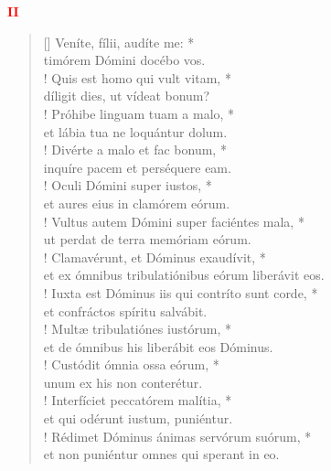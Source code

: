 \begin{center}
\textcolor{red}{\bf II}
\end{center}
\begin{verse}[\versewidth]
Veníte, fílii, audíte me: *\\
timórem Dómini docébo vos.\\!
\vin Quis est homo qui vult vitam, *\\
\vin díligit dies, ut vídeat bonum?\\!
Próhibe linguam tuam a malo, *\\
et lábia tua ne loquántur dolum.\\!
\vin Divérte a malo et fac bonum, *\\
\vin inquíre pacem et perséquere eam.\\!
Oculi Dómini super iustos, *\\
et aures eius in clamórem eórum.\\!
\vin Vultus autem Dómini super faciéntes mala, *\\
\vin ut perdat de terra memóriam eórum.\\!
Clamavérunt, et Dóminus exaudívit, *\\
et ex ómnibus tribulatiónibus eórum liberávit eos.\\!
\vin Iuxta est Dóminus iis qui contríto sunt corde, *\\
\vin et confráctos spíritu salvábit.\\!
Multæ tribulatiónes iustórum, *\\
et de ómnibus his liberábit eos Dóminus.\\!
\vin Custódit ómnia ossa eórum, *\\
\vin unum ex his non conterétur.\\!
Interfíciet peccatórem malítia, *\\
et qui odérunt iustum, puniéntur.\\!
\vin Rédimet Dóminus ánimas servórum suórum, *\\
\vin et non puniéntur omnes qui sperant in eo.\\
\end{verse}
\vspace{1cm}


